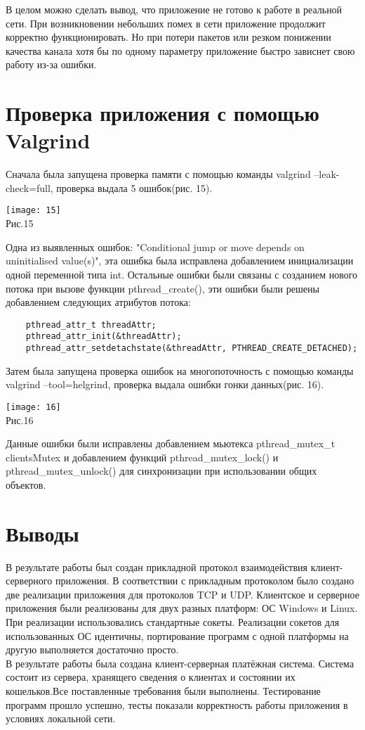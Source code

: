 \documentclass[12pt,a4paper]{report}
\begin{document}
В целом можно сделать вывод, что приложение не готово к работе в реальной сети. При возникновении небольших помех в сети приложение продолжит корректно функционировать. Но при потери пакетов или резком понижении качества канала хотя бы по одному параметру приложение быстро зависнет свою работу из-за ошибки.
\chapter{Проверка приложения с помощью Valgrind}
Сначала была запущена проверка памяти с помощью команды valgrind --leak-check=full, проверка выдала 5 ошибок(рис. 15).
\begin{center}
\texttt{[image: 15]}\\
Рис.15\\
\end{center}
Одна из выявленных ошибок: "Conditional jump or move depends on uninitialised value(s)", эта ошибка была исправлена добавлением инициализации одной переменной типа int. Остальные ошибки были связаны с созданием нового потока при вызове функции pthread\_create(), эти ошибки были решены добавлением следующих атрибутов потока:
\begin{lstlisting}
    pthread_attr_t threadAttr;
    pthread_attr_init(&threadAttr);
    pthread_attr_setdetachstate(&threadAttr, PTHREAD_CREATE_DETACHED);
\end{lstlisting}
Затем была запущена проверка ошибок на многопоточность с помощью команды valgrind --tool=helgrind, проверка выдала ошибки гонки данных(рис. 16).
\begin{center}
\texttt{[image: 16]}\\
Рис.16\\
\end{center}
Данные ошибки были исправлены добавлением мьютекса pthread\_mutex\_t clientsMutex и добавлением функций pthread\_mutex\_lock() и pthread\_mutex\_unlock() для синхронизации при использовании общих объектов.
\chapter{Выводы}
В результате работы был создан прикладной протокол взаимодействия клиент-серверного приложения. В соответствии с прикладным протоколом было создано две реализации приложения для протоколов TCP и UDP. Клиентское и серверное приложения были реализованы для двух разных платформ: ОС Windows и Linux. При реализации использовались стандартные сокеты. Реализации сокетов для использованных ОС идентичны, портирование программ с одной платформы на другую выполняется достаточно просто.\\
В результате работы была создана клиент-серверная платёжная система. Система состоит из сервера, хранящего сведения о клиентах и состоянии их кошельков.Все поставленные требования были выполнены. Тестирование программ прошло успешно, тесты показали корректность работы приложения в условиях локальной сети.
\end{document}

